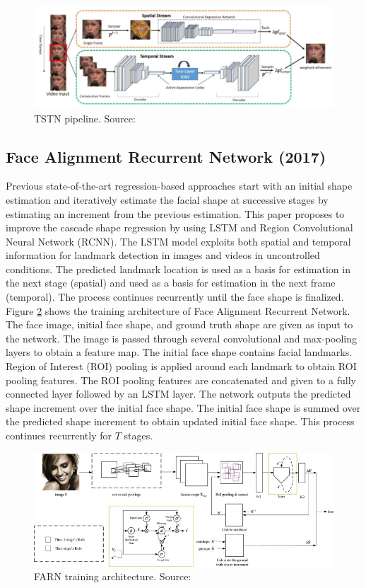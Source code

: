 \documentclass{llncs}
\begin{document}
\begin{figure}
\centering
\includegraphics[scale=0.5]{Media/TSTN}
\caption{TSTN pipeline. Source:\cite{tstn}}
\label{TSTN}
\end{figure}




\subsection{Face Alignment Recurrent Network (2017) \cite{farn}}

Previous state-of-the-art regression-based approaches start with an initial shape estimation and iteratively estimate the facial shape at successive stages by estimating an increment from the previous estimation. This paper proposes to improve the cascade shape regression by using LSTM and Region Convolutional Neural Network (RCNN). The LSTM model exploits both spatial and temporal information for landmark detection in images and videos in uncontrolled conditions. The predicted landmark location is used as a basis for estimation in the next stage (spatial) and used as a basis for estimation in the next frame (temporal). The process continues recurrently until the face shape is finalized. 
Figure \ref{farn_training} shows the training architecture of Face Alignment Recurrent Network. The face image, initial face shape, and ground truth shape are given as input to the network. The image is passed through several convolutional and max-pooling layers to obtain a feature map. The initial face shape contains facial landmarks. Region of Interest (ROI) pooling is applied around each landmark to obtain ROI pooling features. The ROI pooling features are concatenated and given to a fully connected layer followed by an LSTM layer. The network outputs the predicted shape increment over the initial face shape. The initial face shape is summed over the predicted shape increment to obtain updated initial face shape. This process continues recurrently for $T$ stages.

\begin{figure}
\centering
\includegraphics[scale=0.5]{Media/farn_training}
\caption{FARN training architecture. Source:\cite{farn}}
\label{farn_training}
\end{figure}
\end{document}
